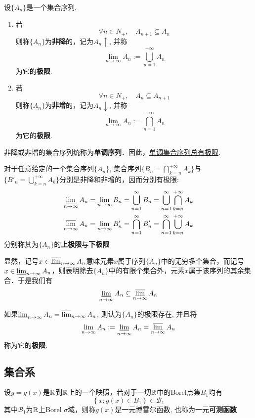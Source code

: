 \begin{definition}[集合的极限]
    设$\{ A_n \}$是一个集合序列,
    \begin{enumerate}
        \item 若
              \[ \forall n \in N_+ ,\quad A_{n+1} \subseteq A_n \]
              则称$\{ A_n \}$为\textbf{非降}的，记为$A_n\uparrow$, 并称
              \[ \lim_{n \to \infty}A_n := \bigcup_{n=1}^{+\infty}A_n \]
              为它的\textbf{极限}.
        \item 若
              \[ \forall n \in N_+ ,\quad A_{n} \subseteq A_{n+1} \]
              则称$\{ A_n \}$为\textbf{非增}的，记为$A_n\downarrow$, 并称
              \[ \lim_{n \to \infty}A_n := \bigcap_{n=1}^{+\infty}A_n \]
              为它的\textbf{极限}.
    \end{enumerate}
    非降或非增的集合序列统称为\textbf{单调序列}．因此，\underline{单调集合序列总有极限}.
\end{definition}

\begin{definition}[上极限与下极限]
    对于任意给定的一个集合序列$\{ A_n \}$, 集合序列$\{B_n= \bigcap_{k=n}^{+\infty}A_k \}$与$\{B'_n=  \bigcup_{k=n}^{+\infty}A_k \}$分别是非降和非增的，因而分别有极限:
    \begin{align*}
        \varliminf_{n \to \infty}A_n =\lim_{n \to \infty} B_n = \bigcup_{n=1}^{\infty} B_n= \bigcup_{n=1}^{\infty} \bigcap_{k=n}^{+\infty}A_k \\
        \varlimsup_{n \to \infty}A_n =\lim_{n \to \infty} B'_n = \bigcap_{n=1}^{\infty} B'_n= \bigcap_{n=1}^{\infty} \bigcup_{k=n}^{+\infty}A_k
    \end{align*}
    分别称其为$\{ A_n \}$的\textbf{上极限}与\textbf{下极限}
\end{definition}

显然，记号$x \in \varlimsup_{n \to \infty}A_n $意味元素$x$属于序列$\{ A_n \}$中的无穷多个集合，而记号$x \in \varliminf_{n \to \infty}A_n $，则表明除去$\{ A_n \}$中的有限个集合外，元素$x$属于该序列的其余集合．于是我们有
\[ \varliminf_{n \to \infty}A_n \subseteq  \varlimsup_{n \to \infty}A_n \]

\begin{definition}
    如果$\varliminf_{n \to \infty}A_n = \varlimsup_{n \to \infty}A_n$, 则认为$\{ A_n \}$的极限存在, 并且将
    \[ \lim_{n \to \infty}A_n := \varliminf_{n \to \infty}A_n = \varlimsup_{n \to \infty}A_n \]
    称为它的\textbf{极限}.
\end{definition}

\subsection{集合系}

\begin{definition}[可测函数]
    设$y =g(x)$是$\mathbb{R}$到$\mathbb{R}$上的一个映照，若对于一切$\mathbb{R}$中的Borel点集$B_1$均有
    \[\left\{ x:g(x) \in B_1 \right\} \in \mathcal{B}_1 \]
    其中$\mathcal{B}_1$为$\mathbb{R}$上Borel $\sigma$域，则称$g(x)$是一元博雷尔函数, 也称为一元\textbf{可测函数}
\end{definition}
